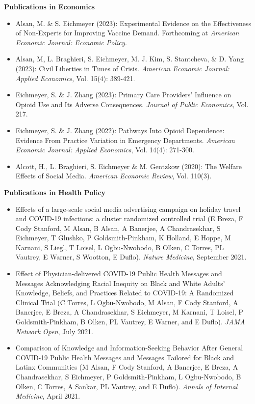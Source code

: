 \documentclass[letterpaper,11pt]{article}
\begin{document}
\begin{normalsize}
\vspace{-0.4cm} 
\textbf{Publications in Economics}
\medskip

\setlength{\parindent}{0pt}
\setlength{\parskip}{0em}

\begin{itemize}[leftmargin=*]
\itemsep0em 
\item Alsan, M. \& S. Eichmeyer (2023): Experimental Evidence on the Effectiveness of Non-Experts for Improving Vaccine Demand. Forthcoming at \textit{American Economic Journal: Economic Policy.}
\item Alsan, M, L. Braghieri, S. Eichmeyer, M. J. Kim, S. Stantcheva, \& D. Yang (2023): Civil Liberties in Times of Crisis. \textit{American Economic Journal: Applied Economics}, Vol. 15(4): 389-421.
\item Eichmeyer, S. \& J. Zhang (2023): Primary Care Providers’ Influence on Opioid Use and Its Adverse Consequences. \textit{Journal of Public Economics}, Vol. 217.
\item Eichmeyer, S. \& J. Zhang (2022): Pathways Into Opioid Dependence: Evidence From Practice Variation in Emergency Departments. \textit{American Economic Journal: Applied Economics}, Vol. 14(4): 271-300.
\item Alcott, H., L. Braghieri, S. Eichmeyer \& M. Gentzkow (2020): The Welfare Effects of Social Media. \textit{American Economic Review}, Vol. 110(3). 
\end{itemize}
\bigskip

\textbf{Publications in Health Policy} 
\medskip
\begin{itemize}[leftmargin=*]
\itemsep0em 
\item Effects of a large-scale social media advertising campaign on holiday travel and COVID-19 infections: a cluster randomized controlled trial (E Breza, F Cody Stanford, M Alsan, B Alsan, A Banerjee, A Chandrasekhar, S Eichmeyer, T Glushko, P Goldsmith-Pinkham, K Holland, E Hoppe, M Karnani, S Liegl, T Loisel, L Ogbu-Nwobodo, B Olken, C Torres, PL Vautrey, E Warner, S Wootton, E Duflo).  \textit{Nature Medicine}, September 2021.
\item Effect of Physician-delivered COVID-19 Public Health Messages and Messages Acknowledging Racial Inequity on Black and White Adults' Knowledge, Beliefs, and Practices Related to COVID-19: A Randomized Clinical Trial (C Torres, L Ogbu-Nwobodo, M Alsan, F Cody Stanford, A Banerjee, E Breza, A Chandrasekhar, S Eichmeyer, M Karnani, T Loisel, P Goldsmith-Pinkham, B Olken, PL Vautrey, E Warner, and E Duflo).   \textit{JAMA Network Open}, July 2021. 
\item Comparison of Knowledge and Information-Seeking Behavior After General COVID-19 Public Health Messages and Messages Tailored for Black and Latinx Communities (M Alsan, F Cody Stanford, A Banerjee, E Breza, A Chandrasekhar, S Eichmeyer, P Goldsmith-Pinkham, L Ogbu-Nwobodo, B Olken, C Torres, A Sankar, PL Vautrey, and E Duflo).  \textit{Annals of Internal Medicine}, April 2021. 
\end{itemize}


\end{normalsize}
\end{document}
